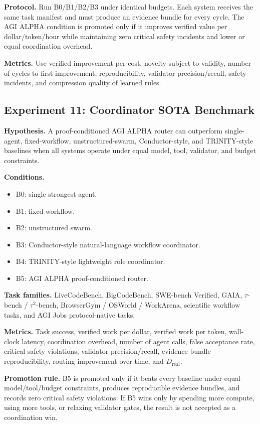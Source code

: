 \documentclass[11pt]{article}
\providecommand{\tightlist}{\setlength{\itemsep}{0pt}\setlength{\parskip}{0pt}}
\begin{document}
\textbf{Protocol.} Run B0/B1/B2/B3 under identical budgets. Each system receives the same task manifest and must produce an evidence bundle for every cycle. The AGI ALPHA condition is promoted only if it improves verified value per dollar/token/hour while maintaining zero critical safety incidents and lower or equal coordination overhead.

\textbf{Metrics.} Use verified improvement per cost, novelty subject to validity, number of cycles to first improvement, reproducibility, validator precision/recall, safety incidents, and compression quality of learned rules.

\subsection{Experiment 11: Coordinator SOTA Benchmark}\label{experiment-11-coordinator-sota-benchmark}

\textbf{Hypothesis.} A proof-conditioned AGI ALPHA router can outperform single-agent, fixed-workflow, unstructured-swarm, Conductor-style, and TRINITY-style baselines when all systems operate under equal model, tool, validator, and budget constraints.

\textbf{Conditions.}

\begin{itemize}
\tightlist
\item
  B0: single strongest agent.
\item
  B1: fixed workflow.
\item
  B2: unstructured swarm.
\item
  B3: Conductor-style natural-language workflow coordinator.
\item
  B4: TRINITY-style lightweight role coordinator.
\item
  B5: AGI ALPHA proof-conditioned router.
\end{itemize}

\textbf{Task families.} LiveCodeBench, BigCodeBench, SWE-bench Verified, GAIA, \(\tau\)-bench / \(\tau^2\)-bench, BrowserGym / OSWorld / WorkArena, scientific workflow tasks, and AGI Jobs protocol-native tasks.

\textbf{Metrics.} Task success, verified work per dollar, verified work per token, wall-clock latency, coordination overhead, number of agent calls, false acceptance rate, critical safety violations, validator precision/recall, evidence-bundle reproducibility, routing improvement over time, and \(D_{\mathrm{real}}\).

\textbf{Promotion rule.} B5 is promoted only if it beats every baseline under equal model/tool/budget constraints, produces reproducible evidence bundles, and records zero critical safety violations. If B5 wins only by spending more compute, using more tools, or relaxing validator gates, the result is not accepted as a coordination win.
\end{document}
